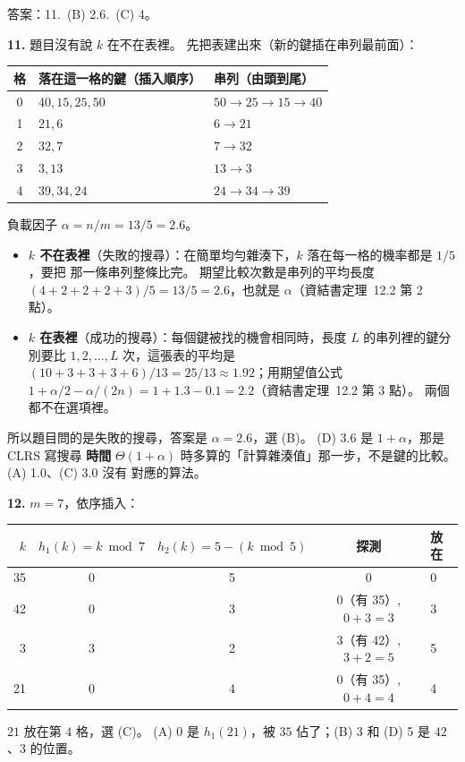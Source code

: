 \begin{pastsoln}
答案：11.~(B) 2.6.~(C) 4。

\textbf{11.} 題目沒有說 $k$ 在不在表裡。 先把表建出來（新的鍵插在串列最前面）：
\begin{center}
\small
\begin{tabular}{cll}
\toprule
格 & 落在這一格的鍵（插入順序） & 串列（由頭到尾） \\
\midrule
0 & $40, 15, 25, 50$ & $50 \to 25 \to 15 \to 40$ \\
1 & $21, 6$ & $6 \to 21$ \\
2 & $32, 7$ & $7 \to 32$ \\
3 & $3, 13$ & $13 \to 3$ \\
4 & $39, 34, 24$ & $24 \to 34 \to 39$ \\
\bottomrule
\end{tabular}
\end{center}
負載因子 $\alpha = n/m = 13/5 = 2.6$。
\begin{itemize}
\item \textbf{$k$ 不在表裡}（失敗的搜尋）：在簡單均勻雜湊下，$k$ 落在每一格的機率都是 $1/5$，要把
那一條串列整條比完。 期望比較次數是串列的平均長度 $(4 + 2 + 2 + 2 + 3)/5 = 13/5 = 2.6$，也就是
$\alpha$（資結書定理~12.2 第 2 點）。
\item \textbf{$k$ 在表裡}（成功的搜尋）：每個鍵被找的機會相同時，長度 $L$ 的串列裡的鍵分別要比
$1, 2, \ldots, L$ 次，這張表的平均是 $(10 + 3 + 3 + 3 + 6)/13 = 25/13 \approx 1.92$；用期望值公式
$1 + \alpha/2 - \alpha/(2n) = 1 + 1.3 - 0.1 = 2.2$（資結書定理~12.2 第 3 點）。 兩個都不在選項裡。
\end{itemize}
所以題目問的是失敗的搜尋，答案是 $\alpha = 2.6$，選 (B)。 (D) 3.6 是 $1 + \alpha$，那是 CLRS 寫搜尋
\textbf{時間} $\Theta(1 + \alpha)$ 時多算的「計算雜湊值」那一步，不是鍵的比較。 (A) 1.0、(C) 3.0 沒有
對應的算法。

\textbf{12.} $m = 7$，依序插入：
\begin{center}
\small
\begin{tabular}{rcccl}
\toprule
$k$ & $h_1(k) = k \bmod 7$ & $h_2(k) = 5 - (k \bmod 5)$ & 探測 & 放在 \\
\midrule
35 & 0 & 5 & 0 & 0 \\
42 & 0 & 3 & 0（有 35）, $0 + 3 = 3$ & 3 \\
3 & 3 & 2 & 3（有 42）, $3 + 2 = 5$ & 5 \\
21 & 0 & 4 & 0（有 35）, $0 + 4 = 4$ & 4 \\
\bottomrule
\end{tabular}
\end{center}
$21$ 放在第 $4$ 格，選 (C)。 (A) 0 是 $h_1(21)$，被 $35$ 佔了；(B) 3 和 (D) 5 是 $42$、$3$ 的位置。
\end{pastsoln}
